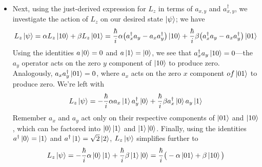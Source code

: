 \documentclass[11pt, a4paper]{article}
\begin{document}
\begin{itemize}
	\item Next, using the just-derived expression for $ L_{z} $ in terms of $ a_{x,y} $ and $ a_{x,y}^{\dagger} $, we investigate the action of $ L_{z} $ on our desired state $ \ket{\psi} $; we have
	\begin{equation*}
		L_{z}\ket{\psi} = \alpha L_{z}\ket{10} + \beta L_{z} \ket{01} =  \frac{\hbar}{i}\alpha\big(a_{x}^{\dagger}a_{y} - a_{x}a_{y}^{\dagger}\big)\ket{10} +  \frac{\hbar}{i}\beta\big(a_{x}^{\dagger}a_{y} - a_{x}a_{y}^{\dagger}\big)\ket{01}
	\end{equation*}
	Using the identities $ a\ket{0} = 0 $ and $ a\ket{1} = \ket{0} $, we see that $ a_{x}^{\dagger}a_{y} \ket{10} = 0 $---the $ a_{y} $ operator acts on the zero $ y $ component of $ \ket{10} $ to produce zero. Analogously, $ a_{x}a_{y}^{\dagger} \ket{01} = 0 $, where $ a_{x} $ acts on the zero $ x $ component $ of \ket{01} $ to produce zero. We're left with
	\begin{equation*}
		L_{z}\ket{\psi} = -\frac{\hbar}{i}\alpha a_{x}\ket{1}a_{y}^{\dagger}\ket{0} + \frac{\hbar}{i}\beta a_{x}^{\dagger}\ket{0}a_{y}\ket{1}
	\end{equation*}
	Remember $ a_{x} $ and $ a_{y} $ act only on their respective components of $ \ket{01} $ and $ \ket{10} $, which can be factored into $ \ket{0}\ket{1} $ and $ \ket{1}\ket{0} $. Finally, using the identities $ a^{\dagger}\ket{0} = \ket{1} $ and $ a^{\dagger}\ket{1} = \sqrt{2}\ket{2} $, $ L_{z}\ket{\psi} $ simplifies further to
	\begin{equation*}
		L_{z}\ket{\psi} = -\frac{\hbar}{i}\alpha\ket{0}\ket{1} + \frac{\hbar}{i}\beta \ket{1}\ket{0} = \frac{\hbar}{i}\big(-\alpha \ket{01} + \beta \ket{10}\big)
	\end{equation*}
	

\end{itemize}
\end{document}
